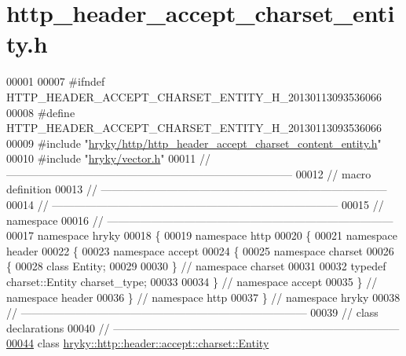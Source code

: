 \hypertarget{http__header__accept__charset__entity_8h_source}{\section{http\-\_\-header\-\_\-accept\-\_\-charset\-\_\-entity.\-h}
}

\begin{DoxyCode}
00001 
00007 \textcolor{preprocessor}{#ifndef HTTP\_HEADER\_ACCEPT\_CHARSET\_ENTITY\_H\_20130113093536066}
00008 \textcolor{preprocessor}{}\textcolor{preprocessor}{#define HTTP\_HEADER\_ACCEPT\_CHARSET\_ENTITY\_H\_20130113093536066}
00009 \textcolor{preprocessor}{}\textcolor{preprocessor}{#include "\hyperlink{http__header__accept__charset__content__entity_8h}{hryky/http/http_header_accept_charset_content_entity.h}"}
00010 \textcolor{preprocessor}{#include "\hyperlink{vector_8h}{hryky/vector.h}"}
00011 \textcolor{comment}{//
      ------------------------------------------------------------------------------}
00012 \textcolor{comment}{// macro definition}
00013 \textcolor{comment}{//
      ------------------------------------------------------------------------------}
00014 \textcolor{comment}{//
      ------------------------------------------------------------------------------}
00015 \textcolor{comment}{// namespace}
00016 \textcolor{comment}{//
      ------------------------------------------------------------------------------}
00017 \textcolor{keyword}{namespace }hryky
00018 \{
00019 \textcolor{keyword}{namespace }http
00020 \{
00021 \textcolor{keyword}{namespace }header
00022 \{
00023 \textcolor{keyword}{namespace }accept
00024 \{
00025 \textcolor{keyword}{namespace }charset
00026 \{
00028     \textcolor{keyword}{class }Entity;
00029 
00030 \} \textcolor{comment}{// namespace charset}
00031 
00032 \textcolor{keyword}{typedef} charset::Entity charset\_type;
00033 
00034 \} \textcolor{comment}{// namespace accept}
00035 \} \textcolor{comment}{// namespace header}
00036 \} \textcolor{comment}{// namespace http}
00037 \} \textcolor{comment}{// namespace hryky}
00038 \textcolor{comment}{//
      ------------------------------------------------------------------------------}
00039 \textcolor{comment}{// class declarations}
00040 \textcolor{comment}{//
      ------------------------------------------------------------------------------}
\hypertarget{http__header__accept__charset__entity_8h_source_l00044}{}\hyperlink{classhryky_1_1http_1_1header_1_1accept_1_1charset_1_1_entity}{00044} \textcolor{comment}{}\textcolor{keyword}{class }\hyperlink{classhryky_1_1http_1_1header_1_1accept_1_1charset_1_1_entity}{hryky::http::header::accept::charset::Entity}

\end{DoxyCode}
